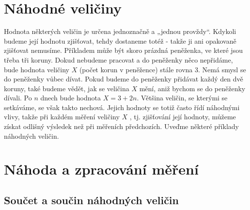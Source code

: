   \section{Náhodné veličiny}\label{mai:IchapIIIsecII}
    Hodnota některých veličin je určena jednoznačně a „jednou provždy“. Kdykoli budeme její hodnotu 
    zjišťovat, tehdy dostaneme totéž - takže ji ani opakovaně zjišťovat nemusíme. Příkladem může 
    být skoro prázdná peněženka, ve které jsou třeba tři koruny. Dokud nebudeme pracovat a do 
    peněženky něco nepřidáme, bude hodnota veličiny \(X\) (počet korun v peněžence) stále rovna 
    \num{3}. Nemá smysl se do peněženky vůbec dívat. Pokud budeme do peněženky přidávat každý den 
    dvě koruny, také budeme vědět, jak se veličina \(X\) mění, aniž bychom se do peněženky dívali. 
    Po \(n\) dnech bude hodnota \(X = 3 + 2n\). Většina veličin, se kterými se setkáváme, se však 
    takto nechová. Jejich hodnoty se totiž často řídí náhodnými vlivy, takže při každém
    měření veličiny \(X\) , tj. zjišťování její hodnoty, můžeme získat odlišný výsledek než při 
    měřeních předchozích. Uveďme některé příklady náhodných veličin.
  
  
  
  
  
  
  
  
  
  
  
  
  
  
  
  
  
  
  
  
  
  
  
  
  
  
  
  
  
  
  \section{Náhoda a zpracování měření}
    \subsection{Součet a součin náhodných veličin}
\printbibliography[heading=subbibliography]
